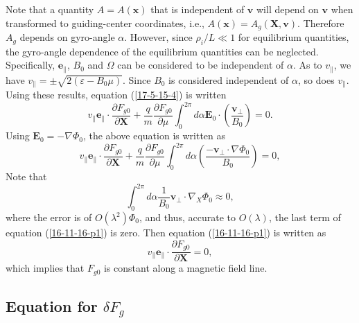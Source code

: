 \documentclass{article}
\begin{document}
Note that a quantity $A = A (\mathbf{x})$ that is independent of $\mathbf{v}$
will depend on $\mathbf{v}$ when transformed to guiding-center coordinates,
i.e., $A (\mathbf{x}) = A_g (\mathbf{X}, \mathbf{v})$. Therefore $A_g$ depends
on gyro-angle $\alpha$. However, since $\rho_i / L \ll 1$ for equilibrium
quantities, the gyro-angle dependence of the equilibrium quantities can be
neglected. Specifically, $\mathbf{e}_{\parallel}$, $B_0$ and $\Omega$ can be
considered to be independent of $\alpha$. As to $v_{\parallel}$, we have
$v_{\parallel} = \pm \sqrt{2 (\varepsilon - B_0 \mu)}$. Since $B_0$ is
considered independent of $\alpha$, so does $v_{\parallel}$. Using these
results, equation (\ref{17-5-15-4}) is written
\begin{equation}
  v_{\parallel} \mathbf{e}_{\parallel} \cdot \frac{\partial F_{g 0}}{\partial
  \mathbf{X}} + \frac{q}{m}  \frac{\partial F_{g 0}}{\partial \mu} \int_0^{2
  \pi} d \alpha \mathbf{E}_0 \cdot \left( \frac{\mathbf{v}_{\perp}}{B_0}
  \right) = 0.
\end{equation}
Using $\mathbf{E}_0 = - \nabla \Phi_0$, the above equation is written as
\begin{equation}
  \label{16-11-16-p1} v_{\parallel} \mathbf{e}_{\parallel} \cdot
  \frac{\partial F_{g 0}}{\partial \mathbf{X}} + \frac{q}{m}  \frac{\partial
  F_{g 0}}{\partial \mu} \int_0^{2 \pi} d \alpha \left(
  \frac{-\mathbf{v}_{\perp} \cdot \nabla \Phi_0}{B_0}  \right) = 0,
\end{equation}
Note that
\begin{equation}
  \int_0^{2 \pi} d \alpha \frac{1}{B_0} \mathbf{v}_{\perp} \cdot \nabla_X
  \Phi_0 \approx 0,
\end{equation}
where the error is of $O (\lambda^2) \Phi_0$, and thus, accurate to $O
(\lambda)$, the last term of equation (\ref{16-11-16-p1}) is zero. Then
equation (\ref{16-11-16-p1}) is written as
\begin{equation}
  v_{\parallel} \mathbf{e}_{\parallel} \cdot \frac{\partial F_{g 0}}{\partial
  \mathbf{X}} = 0,
\end{equation}
which implies that $F_{g 0}$ is constant along a magnetic field line.

\subsection{Equation for $\delta F_g$}
\end{document}
